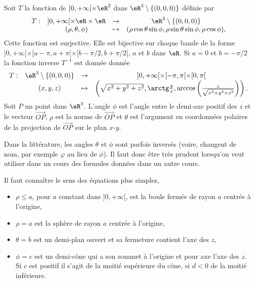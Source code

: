 Soit $T$ la fonction de $]0, +\infty[\times \eR^2$ dans $\eR^3\setminus\{(0,0,0)\}$ définie par
\begin{equation}
  \begin{array}{lccc}
    T: &]0, +\infty[\times \eR\times \eR & \to & \eR^3\setminus\{(0,0,0)\}\\
 & (\rho, \theta, \phi)&\mapsto& (\rho\cos \theta\sin \phi, \rho \sin \theta\sin \phi, \rho\cos \phi),
  \end{array}
\end{equation}
Cette fonction est surjective. Elle est bijective sur chaque bande de la forme  $]0, +\infty[\times [a-\pi,a+\pi[\times [b-\pi/2, b+\pi/2[$, $a$ et $b$ dans $\eR$.  Si $a =0$ et $b=-\pi/2$ la fonction inverse $T^{-1}$ est donnée donnée
\begin{equation}
  \begin{array}{lccc}
    T: &\eR^3\setminus\{(0,0,0)\} & \to & ]0, +\infty[\times [-\pi,\pi[\times [0, \pi[\\
 & (x,y,z)&\mapsto& \left(\sqrt{x^2+y^2+z^2}, \arctg \frac{y}{x}, \arccos \left(\frac{z}{\sqrt{x^2+y^2+z^2}}\right)\right).
  \end{array}
\end{equation}
Soit $ P$ un point dans $\eR^3$. L'angle $\phi$ est l'angle entre le demi-axe positif des $z$ et le vecteur $\overrightarrow{OP}$, $\rho$ est la norme de $\overrightarrow{OP}$ et $\theta$ est l'argument en coordonnées polaires de la projection de $\overrightarrow{OP}$ sur le plan $x$-$y$.

\begin{remark}
	Dans la littérature, les angles $\theta$ et $\phi$ sont parfois inversés (voire, changent de nom, par exemple $\varphi$ au lieu de $\phi$). Il faut donc être très prudent lorsqu'on veut utiliser dans un cours des formules données dans un autre cours.
\end{remark}

\begin{example}
Il faut connaître le sens des équations plus simples,
\begin{itemize}
\item $\rho\leq a$, pour $a$ constant dans  $]0, +\infty[$, est la boule fermée de rayon $a$ centrée à l'origine,
\item $\rho= a$ est  la sphère de rayon $a$ centrée à l'origine,
\item $\theta = b$ est un demi-plan ouvert et sa fermeture contient l'axe des $z$,
\item $\phi= c$ est un demi-cône qui a  son sommet à l'origine et  pour axe l'axe des $z$.  Si $c$ est positif  il s'agit  de la moitié supérieure du cône, si $d<0$ de la moitié inférieure.
\end{itemize}
 \end{example}

